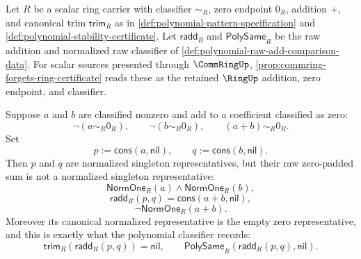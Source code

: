 \begin{proposition}
\label{prop:raw-polynomial-addition-leaves-singleton-normal-form}
Let $R$ be a scalar ring carrier with classifier $\sim_R$, zero endpoint $0_R$, addition $+$, and canonical trim $\mathsf{trim}_R$ as in \autoref{def:polynomial-pattern-specification} and \autoref{def:polynomial-stability-certificate}. Let $\mathsf{radd}_R$ and $\mathsf{PolySame}_R$ be the raw addition and normalized raw classifier of \autoref{def:polynomial-raw-add-comparison-data}. For scalar sources presented through $\CommRingUp$, \autoref{prop:commring-forgets-ring-certificate} reads these as the retained $\RingUp$ addition, zero endpoint, and classifier.

Suppose $a$ and $b$ are classified nonzero and add to a coefficient classified as zero:
$$
\neg(a\sim_R0_R),\qquad \neg(b\sim_R0_R),\qquad (a+b)\sim_R0_R.
$$
Set
$$
p:=\mathsf{cons}(a,\mathsf{nil}),\qquad q:=\mathsf{cons}(b,\mathsf{nil}).
$$
Then $p$ and $q$ are normalized singleton representatives, but their raw zero-padded sum is not a normalized singleton representative:
$$
\mathsf{NormOne}_R(a)\land \mathsf{NormOne}_R(b),
$$
$$
\mathsf{radd}_R(p,q)=\mathsf{cons}(a+b,\mathsf{nil}),
$$
$$
\neg\mathsf{NormOne}_R(a+b).
$$
Moreover its canonical normalized representative is the empty zero representative, and this is exactly what the polynomial classifier records:
$$
\mathsf{trim}_R(\mathsf{radd}_R(p,q))=\mathsf{nil},
\qquad
\mathsf{PolySame}_R(\mathsf{radd}_R(p,q),\mathsf{nil}).
$$
\end{proposition}
